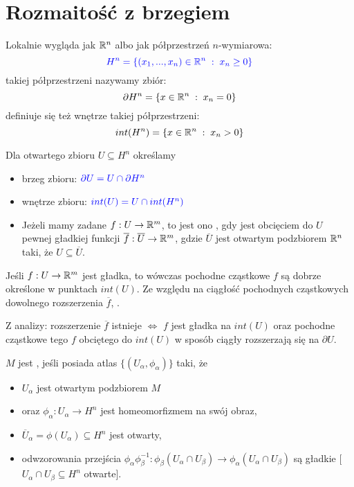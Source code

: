 \section{Rozmaitość z brzegiem}

Lokalnie wygląda jak $\mathbb{R}^n$ albo jak półprzestrzeń $n$-wymiarowa:
$$\color{blue}H^n=\{(x_1,...,x_n)\in\mathbb{R}^n\;:\;x_n\geq 0\}$$
 takiej półprzestrzeni nazywamy zbiór:
$$\partial H^n=\{x\in\mathbb{R}^n\;:\;x_n=0\}$$
definiuje się też wnętrze takiej półprzestrzeni:
$$int(H^n)=\{x\in\mathbb{R}^n\;:\;x_n>0\}$$

\begin{definicja}
Dla otwartego zbioru $U\subseteq H^n$ określamy
\begin{itemize}
    \item[\point] brzeg zbioru: $\color{blue}\partial U=U\cap \partial H^n$
    \item[\point] wnętrze zbioru: $\color{blue}int(U)=U\cap int(H^n)$ 
    \item[\point] Jeżeli mamy zadane $f:U\to\mathbb{R}^m$, to jest ono , gdy jest obcięciem do $U$ pewnej gładkiej funkcji $\overline f:\overline U\to \mathbb{R}^m$, gdzie $\overline U$ jest otwartym podzbiorem $\mathbb{R}^n$ taki, że $U\subseteq\overline U$.
\end{itemize}
\end{definicja}

Jeśli $f:U\to\mathbb{R}^m$ jest gładka, to wówczas pochodne cząstkowe $f$ są dobrze określone w punktach $int(U)$. Ze względu na ciągłość pochodnych cząstkowych dowolnego rozszerzenia $\overline f$, . 

\begin{fakt}
Z analizy: rozszerzenie $\overline f$ istnieje $\iff$ $f$ jest gładka na $int(U)$ oraz pochodne cząstkowe tego $f$ obciętego do $int(U)$ w sposób ciągły rozszerzają się na $\partial U$.
\end{fakt}

\begin{definicja}
$M$ jest , jeśli posiada atlas $\{(U_\alpha,\phi_\alpha)\}$ taki, że 
\begin{itemize}
    \item[\point] $U_\alpha$ jest otwartym podzbiorem $M$ 
    \item[\point] oraz $\phi_{\alpha}:U_\alpha\to H^n$ jest homeomorfizmem na swój obraz, 
    \item[\point] $\overline U_\alpha=\phi(U_\alpha)\subseteq H^n$ jest otwarty,
    \item[\point] odwzorowania przejścia $\phi_\alpha\phi_\beta^{-1}:\phi_\beta(U_\alpha\cap U_\beta)\to\phi_\alpha(U_\alpha\cap U_\beta)$ są gładkie [$U_\alpha\cap U_\beta\subseteq H^n$ otwarte].
\end{itemize}
\end{definicja}


